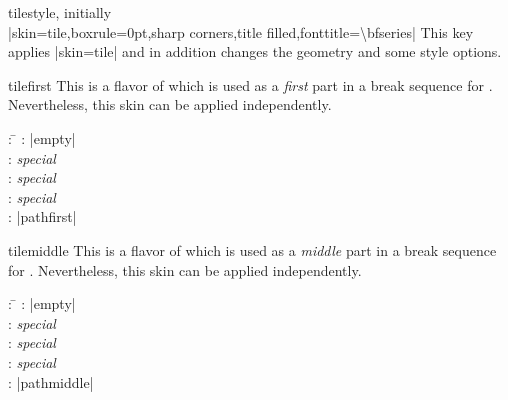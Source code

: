 \begin{docTcbKey}[][doc new=2016-02-25]{tile}{}{style, initially\\
  |skin=tile,boxrule=0pt,sharp corners,title filled,fonttitle=\textbackslash bfseries|
}
  This key applies |skin=tile| and in addition changes the geometry and some style options.
\end{docTcbKey}


\begin{dispExample}
\end{dispExample}


\clearpage
\begin{docSkin}[doc new=2016-02-25]{tilefirst}
This is a flavor of  which is used as a \emph{first} part
in a break sequence for .
Nevertheless, this skin can be applied independently.
\begin{tcolorbox}[skintable=tilefirst]
  \begin{tabbing}
    : \=\kill
    :           \> |empty|\\
    : \> \emph{special}\\ 
    :        \> \emph{special}\\
    :    \> \emph{special}\\
    :           \> |pathfirst|
  \end{tabbing}
\end{tcolorbox}
\end{docSkin}

\begin{dispExample}
\end{dispExample}


\clearpage
\begin{docSkin}[doc new=2016-02-25]{tilemiddle}
This is a flavor of  which is used as a \emph{middle} part
in a break sequence for .
Nevertheless, this skin can be applied independently.
\begin{tcolorbox}[skintable=tilemiddle]
  \begin{tabbing}
    : \=\kill
    :           \> |empty|\\
    : \> \emph{special}\\ 
    :        \> \emph{special}\\
    :    \> \emph{special}\\
    :           \> |pathmiddle|
  \end{tabbing}
\end{tcolorbox}
\end{docSkin}


